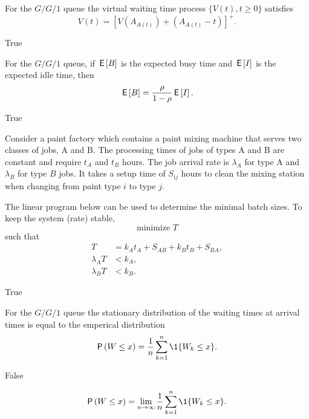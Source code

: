 \begin{exercise}[201704]%
For the $G/G/1$ queue the virtual waiting time process $\{V(t), t\geq 0\}$ 
satisfies
      \begin{equation*}
        V(t) = [V(A_{A(t)}) + (A_{A(t)}-t)]^+.
      \end{equation*}
\begin{solution} True
\end{solution}
\end{exercise}

\begin{exercise}[201704]%
  For the $G/G/1$ queue, if $\,\mathsf{E}\left[B\right]$ is the expected busy time and
  $\,\mathsf{E}\left[I\right]$ is the expected idle time, then
\begin{equation*}
  \,\mathsf{E}\left[B\right] = \frac{\rho }{1-\rho} \,\mathsf{E}\left[I\right]. 
\end{equation*}
\begin{solution} True
\end{solution}
\end{exercise}

\begin{exercise}[201704]%
  Consider a paint factory which contains a paint mixing machine that
  serves two classes of jobs, A and B. The processing times of jobs of
  types A and B are constant and require $t_A$ and $t_B$ hours. The
  job arrival rate is $\lambda_A$ for type A and $\lambda_B$ for type
  $B$ jobs. It takes a setup time of $S_{i j}$ hours to clean the mixing
  station when changing from paint type $i$ to type $j$.

  The linear program below can be used to determine the minimal batch
  sizes.  To keep the system (rate) stable,
\begin{equation*}
  \text{minimize }  T
\end{equation*}
such that
\begin{align*}
 T&=  k_A t_A + S_{AB} + k_B t_B + S_{BA}, \\
 \lambda_A T &< k_A,  \\
 \lambda_B T &< k_B.
\end{align*}

\begin{solution} True
\end{solution}
\end{exercise}

\begin{exercise}[201704]%
  For the $G/G/1$ queue the stationary distribution  of
  the waiting times at arrival times is equal to the emperical distribution
\begin{equation*}
  \P{W \leq x}  =  \frac 1n\sum_{k=1}^n \1{W_k\leq x}.
\end{equation*}
\begin{solution} False
  
\begin{equation}
  \P{W \leq x}  = \lim_{n\to\infty} \frac 1n\sum_{k=1}^n \1{W_k\leq x}.
\end{equation}

\end{solution}
\end{exercise}



